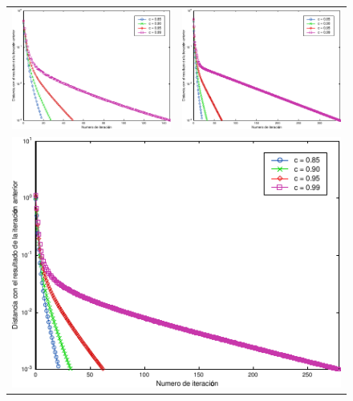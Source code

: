             \begin{figure}
                \begin{center}

                    \begin{tabular}{cc}
                        \includegraphics{graficos/exp2-a.pdf} & \includegraphics{graficos/exp2-b.pdf} \\
                        \multicolumn{2}{c}{\includegraphics{graficos/exp2-c.pdf}}
                    \end{tabular}


\end{center}
\end{figure}
